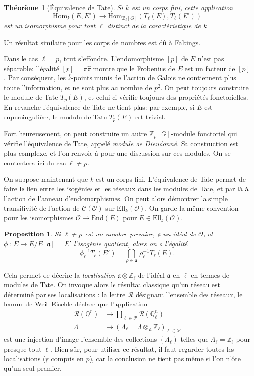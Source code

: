 \documentclass[11pt,a4paper]{article}
\newcommand{\Z}{\mathbb{Z}}
\newcommand{\Q}{\mathbb{Q}}
\renewcommand{\O}{\mathcal{O}}
\newcommand{\Cl}{\mathcal{C}}
\newcommand{\vers}{\longrightarrow}
\newcommand{\End}{\mathrm{End}}
\newcommand{\Hom}{\mathrm{Hom}}
\newcommand{\Ell}{\mathrm{Ell}}
\renewcommand{\frak}{\mathfrak}
\newcommand{\de}{\,:\,}
\renewcommand{\v}{\vspace{5mm}}
\newtheorem*{thm}{Théorème}
\newtheorem*{prop}{Proposition}
\theoremstyle{definition}
\begin{document}
\begin{thm}[Équivalence de Tate] Si $k$ est un corps fini, cette application
$$\Hom_k(E, E') \vers \Hom_{\Z_\ell[G]} (T_\ell(E), T_\ell(E'))$$
est un isomorphisme pour tout $\ell$ distinct de la caractéristique de $k$.
\end{thm}

Un résultat similaire pour les corps de nombres est dû à Faltings.
\v

Dans le cas $\ell=p$, tout s'effondre. L'endomorphisme $[p]$ de $E$ n'est pas séparable: l'égalité
$[p] = \pi \hat{\pi}$
montre que le Frobenius de $E$ est un facteur de $[p]$. Par conséquent, les $\bar{k}$-points munis de l'action de Galois ne contiennent plus toute l'information, et ne sont plus au nombre de $p^2$. On peut toujours construire le module de Tate $T_p(E)$, et celui-ci vérifie toujours des propriétés fonctorielles. En revanche l'équivalence de Tate ne tient plus: par exemple, si $E$ est supersingulière, le module de Tate $T_p(E)$ est trivial.

Fort heureusement, on peut construire un autre $\Z_p[G]$-module fonctoriel qui vérifie l'équivalence de Tate, appelé \emph{module de Dieudonné}. Sa construction est plus complexe, et l'on renvoie à \cite{Waterhouse} pour une discussion sur ces modules. On se contentera ici du cas $\ell\neq p$.
\v

On suppose maintenant que $k$ est un corps fini. L'équivalence de Tate permet de faire le lien entre les isogénies et les réseaux dans les modules de Tate, et par là à l'action de l'anneau d'endomorphismes. On peut alors démontrer la simple transitivité de l'action de $\Cl(\O)$ sur $\Ell_k(\O)$. On garde la même convention pour les isomorphismes $\O\vers \End(E)$ pour $E\in\Ell_k(\O)$.

\begin{prop}
Si $\ell\neq p$ est un nombre premier, $\frak a$ un idéal de $\O$, et $\phi\de E\vers E/E[\frak a] = E'$ l'isogénie quotient, alors on a l'égalité
$$\phi_\ell^{-1} T_\ell(E') = \bigcap_{\rho\in\frak a}\ \rho_\ell^{-1} T_\ell(E) .$$
\end{prop}

Cela permet de décrire la \emph{localisation} $\frak a\otimes \Z_\ell$ de l'idéal $\frak a$ en $\ell$ en termes de modules de Tate. On invoque alors le résultat classique qu'un réseau est déterminé par ses localisations : la lettre $\mathcal{R}$ désignant l'ensemble des réseaux, le lemme de Weil--Eischle déclare que l'application
$$\begin{aligned}
\mathcal{R}(\Q^n) &\longrightarrow \prod_{\ell\in \mathcal{P}} \mathcal{R}(\Q_\ell^n) \\
\Lambda\ \ &\longmapsto (\Lambda_\ell = \Lambda\otimes_\Z \Z_\ell)_{\ell\in\mathcal{P}}
\end{aligned}$$
est une injection d'image l'ensemble des collections $(\Lambda_\ell)$ telles que $\Lambda_\ell = \Z_\ell$ pour presque tout $\ell$. Bien sûr, pour utiliser ce résultat, il faut regarder toutes les localisations (y compris en $p$), car la conclusion ne tient pas même si l'on n'ôte qu'un seul premier.
\end{document}
